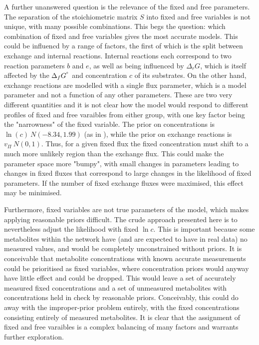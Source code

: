 \documentclass[10pt,letterpaper]{article}
\newcommand{\sdgf}{\Delta_fG^{\degree}}
\newcommand{\dgr}{\Delta_rG}
\begin{document}
A further unanswered question is the relevance of the fixed and free parameters.
The separation of the stoichiometric matrix $S$ into fixed and free variables is not unique, with many possible combinations.
This begs the question: which combination of fixed and free variables gives the most accurate models.
This could be influencd by a range of factors, the first of which is the split between exchange and internal reactions.
Internal reactions each correspond to two reaction parameters $b$ and $e$, as well as being influenced by $\dgr$, which is itself affected by the $\sdgf$ and concentration $c$ of its substrates.
On the other hand, exchange reactions are modelled with a single flux parameter, which is a model parameter and not a function of any other parameters.
These are two very different quantities and it is not clear how the model would respond to different profiles of fixed and free varaibles from either group, with one key factor being the "narrowness" of the fixed variable.
The prior on concentrations is $\ln(c) ~ N(-8.34, 1.99)$ (as in \cite{PTA}), while the prior on exchange reactions is $v_\Pi ~ N(0, 1)$. %
Thus, for a given fixed flux the fixed concentration must shift to a much more unlikely region than the exchange flux.
This could make the parameter space more "bumpy", with small changes in parameters leading to changes in fixed fluxes that correspond to large changes in the likelihood of fixed parameters.
If the number of fixed exchange fluxes were maximised, this effect may be minimised.

Furthermore, fixed variables are not true parameters of the model, which makes applying reasonable priors difficult.
The crude approach presented here is to nevertheless adjust the likelihood with fixed $\ln{c}$.
This is important because some metabolites within the network have (and are expected to have in real data) no measured values, and would be completely unconstrained without priors.
It is conceivable that metabolite concentrations with known accurate measurements could be prioritised as fixed variables, where concentration priors would anyway have little effect and could be dropped.
This would leave a set of accurately measured fixed concentrations and a set of unmeasured metabolites with concentrations held in check by reasonable priors.
Conceivably, this could do away with the improper-prior problem entirely, with the fixed concentrations consisting entirely of measured metabolites.
It is clear that the assignment of fixed and free varaibles is a complex balancing of many factors and warrants further exploration.
\end{document}
